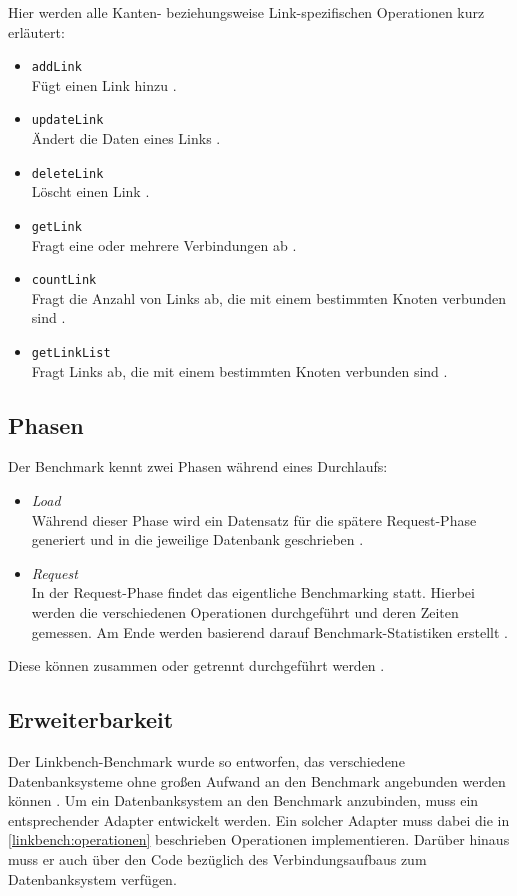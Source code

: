 Hier werden alle Kanten- beziehungsweise Link-spezifischen Operationen kurz erläutert:
\begin{itemize}
    \item \texttt{addLink}\\
    Fügt einen Link hinzu \cite{fb_linkbench_github}.
    \item \texttt{updateLink}\\
    Ändert die Daten eines Links  \cite{fb_linkbench_github}.
    \item \texttt{deleteLink}\\
    Löscht einen Link \cite{fb_linkbench_github}.
    \item \texttt{getLink}\\
    Fragt eine oder mehrere Verbindungen ab \cite{fb_linkbench_github}.
    \item \texttt{countLink}\\
    Fragt die Anzahl von Links ab, die mit einem bestimmten Knoten verbunden sind \cite{fb_linkbench_github}.
    \item \texttt{getLinkList}\\
    Fragt Links ab, die mit einem bestimmten Knoten verbunden sind \cite{fb_linkbench_github}.
\end{itemize}

\subsection{Phasen}
Der Benchmark kennt zwei Phasen während eines Durchlaufs: 
\begin{itemize}
    \item \textit{Load}\\
    Während dieser Phase wird ein Datensatz für die spätere Request-Phase generiert und in die jeweilige Datenbank geschrieben \cite{fb_linkbench_github}.
    \item \textit{Request}\\
    In der Request-Phase findet das eigentliche Benchmarking statt. Hierbei werden die verschiedenen Operationen durchgeführt und deren Zeiten gemessen. Am Ende werden basierend darauf Benchmark-Statistiken erstellt \cite{fb_linkbench_github}. 
\end{itemize}
Diese können zusammen oder getrennt durchgeführt werden \cite{fb_linkbench_github}.

\subsection{Erweiterbarkeit}
Der Linkbench-Benchmark wurde so entworfen, das verschiedene Datenbanksysteme ohne großen Aufwand an den Benchmark angebunden werden können \cite{linkbench_paper}. Um ein Datenbanksystem an den Benchmark anzubinden, muss ein entsprechender Adapter entwickelt werden. Ein solcher Adapter muss dabei die in \autoref{linkbench:operationen} beschrieben Operationen implementieren. Darüber hinaus muss er auch über den Code bezüglich des Verbindungsaufbaus zum Datenbanksystem verfügen. 

